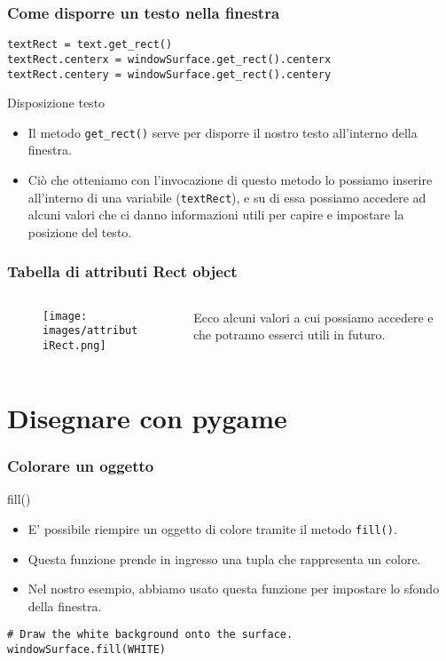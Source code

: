\documentclass{beamer}
\begin{document}
\begin{frame}[fragile]
\frametitle{Come disporre un testo nella finestra}
\begin{lstlisting}
textRect = text.get_rect()
textRect.centerx = windowSurface.get_rect().centerx
textRect.centery = windowSurface.get_rect().centery
\end{lstlisting}

	\begin{block}{Disposizione testo}
		\begin{itemize}
			\item Il metodo \texttt{get\_rect()} serve per disporre il nostro testo all'interno della finestra.
			\item Ciò che otteniamo con l'invocazione di questo metodo lo possiamo inserire all'interno di una variabile (\texttt{textRect}), e su di essa possiamo accedere ad alcuni valori che ci danno informazioni utili per capire e impostare la posizione del testo.
		\end{itemize}
	\end{block}
\end{frame}

\begin{frame}[fragile]
\frametitle{Tabella di attributi Rect object}
\begin{columns}
	\begin{column}[T]{0.7\textwidth}
		\begin{figure}[t]
			\texttt{[image: images/attributiRect.png]}
		\end{figure}
	\end{column}
	\begin{column}[T]{0.3\textwidth}
		Ecco alcuni valori a cui possiamo accedere e che potranno esserci utili in futuro.\\
		
	\end{column}
\end{columns}
\end{frame}

\section{Disegnare con pygame}

\begin{frame}[fragile]
\frametitle{Colorare un oggetto}
\begin{block}{fill()}
	\begin{itemize}
		\item E' possibile riempire un oggetto di colore tramite il metodo \texttt{fill()}.
		\item Questa funzione prende in ingresso una tupla che rappresenta un colore.
		\item Nel nostro esempio, abbiamo usato questa funzione per impostare lo sfondo della finestra.
	\end{itemize}
\end{block}
\begin{lstlisting}
# Draw the white background onto the surface.
windowSurface.fill(WHITE)
\end{lstlisting}
\end{frame}
\end{document}
